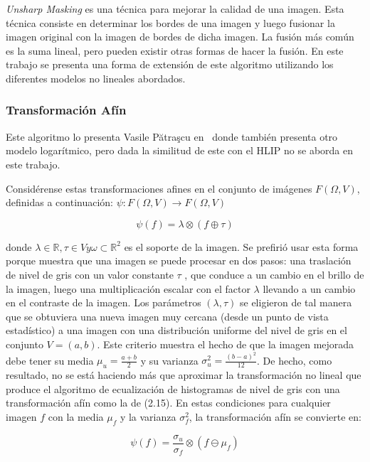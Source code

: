 \textit{Unsharp Masking} es una t\'ecnica para mejorar la calidad de una imagen. Esta t\'ecnica consiste en determinar los bordes de una imagen y luego fusionar la imagen original con la imagen de bordes de dicha imagen. La fusi\'on m\'as com\'un es la suma lineal, pero pueden existir otras formas de hacer la fusi\'on. En este trabajo se presenta una forma de extensi\'on de este algoritmo utilizando los diferentes modelos no lineales abordados.

\subsubsection{Transformaci\'on Af\'in}

Este algoritmo lo presenta Vasile Pătraşcu en~\cite{patrascu2003gray} donde tambi\'en presenta otro modelo logar\'itmico, pero dada la similitud de este con el HLIP no se aborda en este trabajo.

Consid\'erense estas transformaciones afines en el conjunto de imágenes $F (\Omega, V)$, definidas a continuaci\'on: $\psi : F (\Omega, V ) \to F (\Omega, V )$

\begin{equation}
	\psi(f)=\lambda\otimes(f\oplus\tau)
\end{equation}

donde $\lambda \in \mathbb{R}, \tau \in V y \omega\subset\mathbb{R}^2$ es el soporte de la imagen. Se prefirió usar esta forma porque muestra que una imagen se puede procesar en dos pasos: una traslación de nivel de gris con un valor constante $\tau$ , que conduce a un cambio en el brillo de la imagen, luego una multiplicación escalar con el factor $\lambda$  llevando a un cambio en el contraste de la imagen. Los parámetros $(\lambda, \tau )$ se eligieron de tal manera que se obtuviera una nueva imagen muy cercana (desde un punto de vista estadístico) a una imagen con una distribución uniforme del nivel de gris en el conjunto $V=(a,b)$. Este criterio muestra el hecho de que la imagen mejorada debe tener su media $\mu_u = \frac{a+b}{2}$ y su varianza $\sigma_u^2 = \frac{(b-a)^2}{12}$. De hecho, como resultado, no se est\'a haciendo más que aproximar la transformaci\'on no lineal que produce el algoritmo de ecualización de histogramas de nivel de gris con una transformaci\'on afín como la de (2.15). En estas condiciones para cualquier imagen $f$ con la media $\mu_f$ y la varianza $\sigma_f^2 $, la transformaci\'on afín  se convierte en:

\begin{equation}
	\psi(f)=\frac{\sigma_u}{\sigma_f}\otimes(f\ominus\mu_f)
\end{equation}

